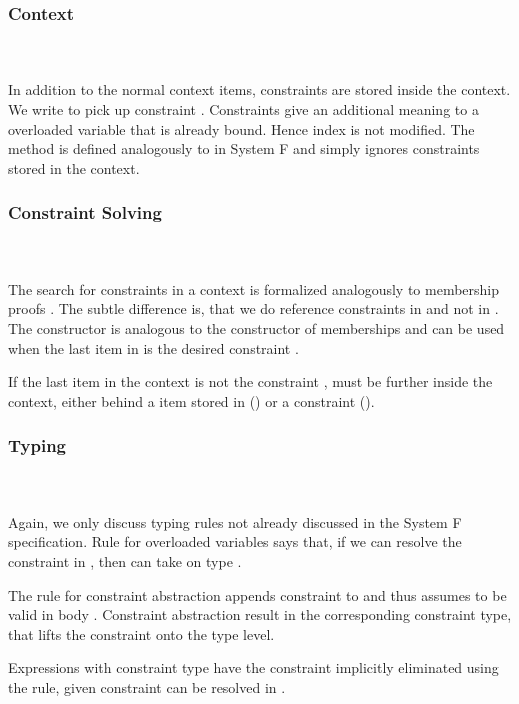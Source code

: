 \subsubsection{Context}\hfill\\\\
In addition to the normal context items, constraints are stored inside the context.
\FoCtx
We write    to pick up constraint . 
Constraints give an additional meaning to a overloaded variable that is already bound. Hence index  is not modified. The  method is defined analogously to  in System F and simply ignores constraints stored in the context.

\subsubsection{Constraint Solving}\hfill\\\\
The search for constraints in a context is formalized analogously to membership proofs   . The subtle difference is, that we do reference constraints in  and not in . 
\FoCstrSolve
The  constructor is analogous to the  constructor of memberships and can be used when the last item in  is the desired constraint .

\noindent If the last item in the context is not the constraint ,  must be further inside the context, either behind a item stored in  () or a constraint (). 

\subsubsection{Typing}\hfill\\\\
Again, we only discuss typing rules not already discussed in the System F specification. 
\FoTyping
Rule  for overloaded variables says that, if we can resolve the constraint  \Constr{:}  in , then  can take on type . 

\noindent The rule for constraint abstraction  appends constraint  to  and thus assumes  to be valid in body . Constraint abstraction result in the corresponding constraint type, that lifts the constraint onto the type level.

\noindent Expressions  with constraint type \Constr{[}  \Constr{]⇒}  have the constraint implicitly eliminated using the  rule, given constraint  can be resolved in . 

